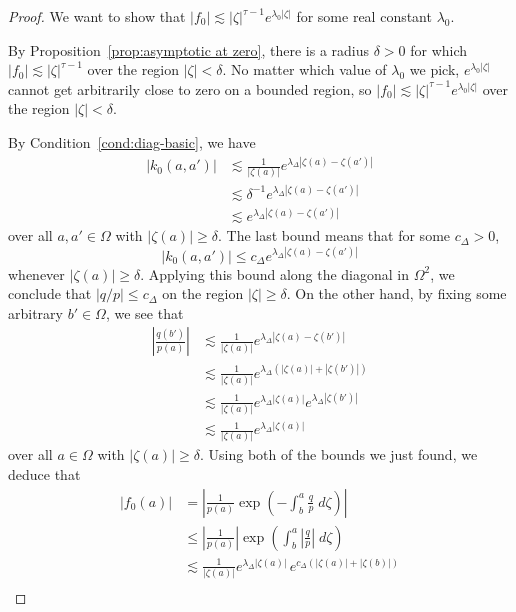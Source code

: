 \documentclass{article}
\theoremstyle{definition}
\theoremstyle{plain}
\newcommand{\hardker}{k_0}
\newcommand{\solproto}{f_0}
\newcommand{\domain}{\Omega}
\begin{document}
\begin{proof}
We want to show that $|\solproto| \lesssim |\zeta|^{\tau-1} e^{\lambda_0|\zeta|}$ for some real constant $\lambda_0$.

By Proposition~\ref{prop:asymptotic at zero}, there is a radius $\delta > 0$ for which $|\solproto| \lesssim |\zeta|^{\tau-1}$ over the region $|\zeta| < \delta$. No matter which value of $\lambda_0$ we pick, $e^{\lambda_0|\zeta|}$ cannot get arbitrarily close to zero on a bounded region, so $|\solproto| \lesssim |\zeta|^{\tau-1} e^{\lambda_0|\zeta|}$ over the region $|\zeta| < \delta$.

By Condition~\eqref{cond:diag-basic}, we have
\begin{align*}
|\hardker(a, a')| & \lesssim \frac{1}{|\zeta(a)|} e^{\lambda_\Delta |\zeta(a) - \zeta(a')|} \\
& \lesssim \delta^{-1} e^{\lambda_\Delta |\zeta(a) - \zeta(a')|} \\
& \lesssim e^{\lambda_\Delta |\zeta(a) - \zeta(a')|}
\end{align*}
over all $a, a' \in \domain$ with $|\zeta(a)| \ge \delta$. The last bound means that for some $c_\Delta > 0$,
\[ |\hardker(a, a')| \le c_\Delta e^{\lambda_\Delta |\zeta(a) - \zeta(a')|} \]
whenever $|\zeta(a)| \ge \delta$. Applying this bound along the diagonal in $\domain^2$, we conclude that $|q/p| \le c_\Delta$ on the region $|\zeta| \ge \delta$. On the other hand, by fixing some arbitrary  $b' \in \domain$, we see that
\begin{align*}
\left|\frac{q(b')}{p(a)}\right| & \lesssim \frac{1}{|\zeta(a)|} e^{\lambda_\Delta|\zeta(a) - \zeta(b')|} \\
& \lesssim \frac{1}{|\zeta(a)|} e^{\lambda_\Delta(|\zeta(a)| + |\zeta(b')|)} \\
& \lesssim \frac{1}{|\zeta(a)|} e^{\lambda_\Delta|\zeta(a)|} e^{\lambda_\Delta|\zeta(b')|} \\
& \lesssim \frac{1}{|\zeta(a)|} e^{\lambda_\Delta|\zeta(a)|}
\end{align*}
over all $a \in \domain$ with $|\zeta(a)| \ge \delta$. Using both of the bounds we just found, we deduce that
\begin{align*}
|\solproto(a)| & = \left| \frac{1}{p(a)} \exp\left(-\int_{b}^{a}\frac{q}{p}\;d\zeta\right) \right| \\
& \le \left|\frac{1}{p(a)}\right| \exp\left(\int_{b}^{a}\left|\frac{q}{p}\right|\;d\zeta\right) \\
& \lesssim \frac{1}{|\zeta(a)|} e^{\lambda_\Delta|\zeta(a)|}\,e^{c_\Delta(|\zeta(a)| + |\zeta(b)|)} \\

\end{align*}
\end{proof}
\end{document}
